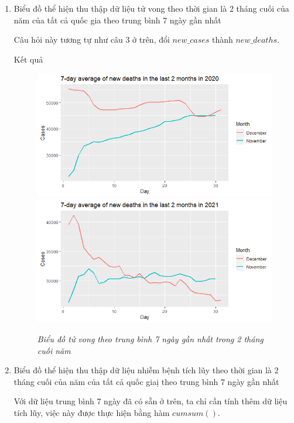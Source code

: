 \documentclass[a4paper]{article}
\theoremstyle{definition}
\begin{document}
\begin{enumerate}[1)]
    \item Biểu đồ thể hiện thu thập dữ liệu tử vong theo thời gian là 2 tháng cuối của năm của tất cả quốc gia theo trung bình 7 ngày gần nhất
    
    Câu hỏi này tương tự như câu 3 ở trên, đổi $new\_cases$ thành $new\_deaths$.
    
    Kết quả
    
    \begin{figure}[H]
    \begin{center}
        \includegraphics[scale = .5]{viii/last2 2020deaths.png}
        \includegraphics[scale = .5]{viii/last2 2021deaths.png}
    \end{center}
        \vspace{+3mm}\caption{\it Biểu đồ tử vong theo trung bình 7 ngày gần nhất trong 2 tháng cuối năm}
    \end{figure}
    
    \item Biểu đồ thể hiện thu thập dữ liệu nhiễm bệnh tích lũy theo thời gian là 2 tháng cuối của năm của tất cả quốc giaị theo trung bình 7 ngày gần nhất
    
Với dữ liệu trung bình 7 ngày đã có sẵn ở trên, ta chỉ cần tính thêm dữ liệu tích lũy, việc này được thực hiện bằng hàm $cumsum()$.
    

\end{enumerate}
\end{document}
